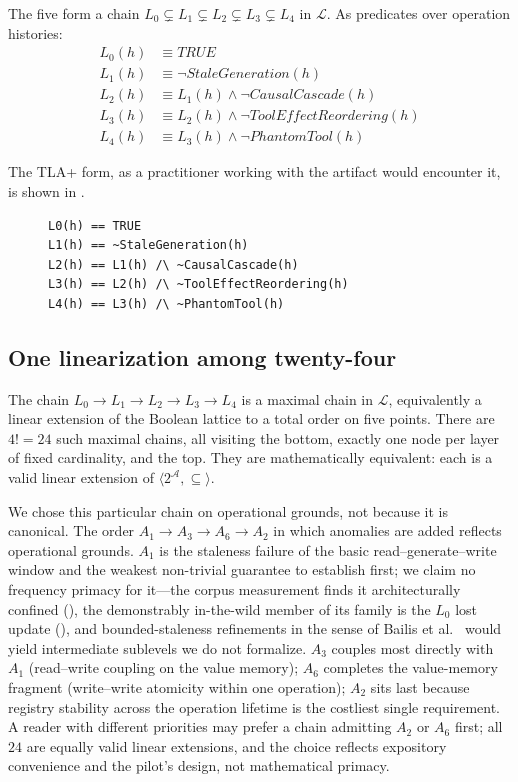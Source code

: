 \documentclass[journal,compsoc,10pt]{IEEEtran}
\theoremstyle{definition}
\theoremstyle{remark}
\newcommand{\fld}[1]{\mathit{#1}}
\begin{document}
\noindent
The five form a chain $L_0 \subsetneq L_1 \subsetneq L_2
\subsetneq L_3 \subsetneq L_4$ in $\mathcal{L}$. As predicates
over operation histories:
\begin{align*}
  L_0(h) &\equiv \mathit{TRUE} \\
  L_1(h) &\equiv \neg \fld{StaleGeneration}(h) \\
  L_2(h) &\equiv L_1(h) \wedge \neg \fld{CausalCascade}(h) \\
  L_3(h) &\equiv L_2(h) \wedge \neg \fld{ToolEffectReordering}(h) \\
  L_4(h) &\equiv L_3(h) \wedge \neg \fld{PhantomTool}(h)
\end{align*}

\noindent
The TLA+ form, as a practitioner working with the artifact would
encounter it, is shown in .

\begin{figure}[h]
\begin{lstlisting}[language=TLA, label=lst:level-tla, caption={The
five named lattice points in TLA+, as in \texttt{Levels.tla}.}]
L0(h) == TRUE
L1(h) == ~StaleGeneration(h)
L2(h) == L1(h) /\ ~CausalCascade(h)
L3(h) == L2(h) /\ ~ToolEffectReordering(h)
L4(h) == L3(h) /\ ~PhantomTool(h)
\end{lstlisting}
\end{figure}

\subsection{One linearization among twenty-four}
\label{sec:lattice-lin}
The chain $L_0 \to L_1 \to L_2 \to L_3 \to L_4$ is a maximal chain
in $\mathcal{L}$, equivalently a linear extension of the Boolean
lattice to a total order on five points. There are $4! = 24$
such maximal chains, all visiting the bottom, exactly one node
per layer of fixed cardinality, and the top. They are
mathematically equivalent: each is a valid linear extension of
$\langle 2^{\mathcal{A}}, \subseteq \rangle$.

We chose this particular chain on operational grounds, not because
it is canonical. The order $A_1 \to A_3 \to A_6 \to A_2$ in which anomalies are added
reflects operational grounds. $A_1$ is the staleness failure of the basic
read--generate--write window and the weakest non-trivial guarantee to
establish first; we claim no frequency primacy for it---the corpus
measurement finds it architecturally confined
(), the demonstrably in-the-wild member of its
family is the $L_0$ lost update
(), and bounded-staleness
refinements in the sense of Bailis et al.~\cite{BailisEtAl2012PBS} would
yield intermediate sublevels we do not formalize. $A_3$ couples most
directly with $A_1$ (read--write coupling on the value memory); $A_6$
completes the value-memory fragment (write--write atomicity within one
operation); $A_2$ sits last because registry stability across the
operation lifetime is the costliest single requirement. A reader with
different priorities may prefer a chain admitting $A_2$ or $A_6$ first;
all $24$ are equally valid linear extensions, and the choice reflects
expository convenience and the pilot's design, not mathematical primacy.
\end{document}
